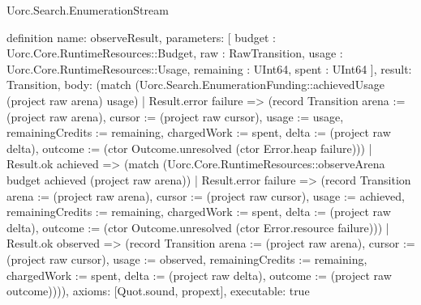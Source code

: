 \begin{lexlean}{Uorc.Search.EnumerationStream}
\begin{semanticmodule}
definition{
  name: observeResult,
  parameters: [
    budget : Uorc.Core.RuntimeResources::Budget,
    raw : RawTransition,
    usage : Uorc.Core.RuntimeResources::Usage,
    remaining : UInt64,
    spent : UInt64
  ],
  result: Transition,
  body: (match (Uorc.Search.EnumerationFunding::achievedUsage (project raw arena) usage)
    | Result.error failure => (record Transition {arena := (project raw arena), cursor := (project raw cursor), usage := usage, remainingCredits := remaining, chargedWork := spent, delta := (project raw delta), outcome := (ctor Outcome.unresolved (ctor Error.heap failure))})
    | Result.ok achieved => (match (Uorc.Core.RuntimeResources::observeArena budget achieved (project raw arena))
      | Result.error failure => (record Transition {arena := (project raw arena), cursor := (project raw cursor), usage := achieved, remainingCredits := remaining, chargedWork := spent, delta := (project raw delta), outcome := (ctor Outcome.unresolved (ctor Error.resource failure))})
      | Result.ok observed => (record Transition {arena := (project raw arena), cursor := (project raw cursor), usage := observed, remainingCredits := remaining, chargedWork := spent, delta := (project raw delta), outcome := (project raw outcome)}))),
  axioms: [Quot.sound, propext],
  executable: true
}


\end{semanticmodule}
\end{lexlean}
